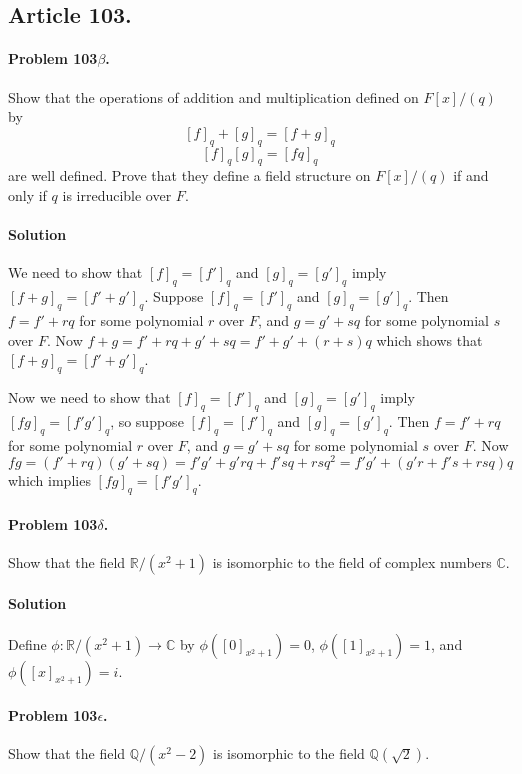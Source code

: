 \subsection{Article 103.}

\paragraph{Problem 103$\beta$.}
Show that the operations of addition and multiplication defined on $F[x]/(q)$
by
$$[f]_q + [g]_q = [f+g]_q$$
$$[f]_q [g]_q = [fq]_q$$
are well defined. Prove that they define a field structure on $F[x]/(q)$ if
and only if $q$ is irreducible over $F$.

\paragraph*{Solution}

We need to show that $[f]_q = [f']_q$ and $[g]_q = [g']_q$ imply
$[f+g]_q = [f'+g']_q$. Suppose $[f]_q = [f']_q$ and $[g]_q = [g']_q$. Then
$f = f' + rq$ for some polynomial $r$ over $F$, and $g = g' + sq$ for some
polynomial $s$ over $F$. Now $f + g = f' + rq + g' + sq = f' + g' + (r + s)q$
which shows that $[f+g]_q = [f'+g']_q$.

Now we need to show that $[f]_q = [f']_q$ and $[g]_q = [g']_q$ imply
$[fg]_q = [f'g']_q$, so suppose $[f]_q = [f']_q$ and $[g]_q = [g']_q$. Then
$f = f' + rq$ for some polynomial $r$ over $F$, and $g = g' + sq$ for some
polynomial $s$ over $F$. Now $fg = (f'+rq)(g'+sq) = f'g' + g'rq + f'sq + rsq^2
= f'g' + (g'r + f's + rsq) q$ which implies $[fg]_q = [f'g']_q$.

\paragraph{Problem 103$\delta$.}
Show that the field $\mathbb{R}/(x^2+1)$ is isomorphic to the field of complex
numbers $\mathbb{C}$.

\paragraph*{Solution}
Define $\phi: \mathbb{R}/(x^2+1) \rightarrow \mathbb{C}$ by
$\phi([0]_{x^2+1}) = 0$, $\phi([1]_{x^2+1}) = 1$, and $\phi([x]_{x^2+1}) = i$.

\paragraph{Problem 103$\epsilon$.}
Show that the field $\mathbb{Q}/(x^2-2)$ is isomorphic to the field
$\mathbb{Q}(\sqrt{2})$.


